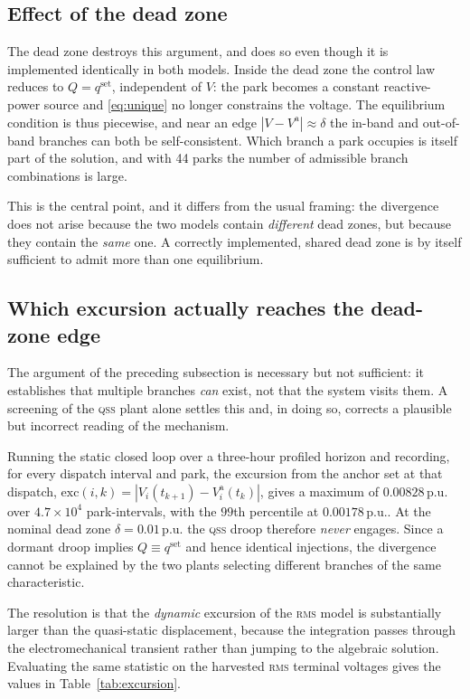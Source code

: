 \documentclass[11pt,a4paper]{article}
\newcommand{\pu}{\ensuremath{\mathrm{p.u.}}}
\newcommand{\qss}{\textsc{qss}}
\newcommand{\rms}{\textsc{rms}}
\begin{document}
\subsection{Effect of the dead zone}

The dead zone destroys this argument, and does so even though it is
implemented identically in both models. Inside the dead zone the control law
reduces to $Q = q^{\mathrm{set}}$, independent of $V$: the park becomes a
constant reactive-power source and \eqref{eq:unique} no longer constrains
the voltage. The equilibrium condition is thus piecewise, and near an edge
$|V - V^{\mathrm{a}}| \approx \delta$ the in-band and out-of-band branches
can both be self-consistent. Which branch a park occupies is itself part of
the solution, and with 44 parks the number of admissible branch combinations
is large.

This is the central point, and it differs from the usual framing: the
divergence does not arise because the two models contain \emph{different}
dead zones, but because they contain the \emph{same} one. A correctly
implemented, shared dead zone is by itself sufficient to admit more than one
equilibrium.

\subsection{Which excursion actually reaches the dead-zone edge}
\label{sec:excursion}

The argument of the preceding subsection is necessary but not sufficient: it
establishes that multiple branches \emph{can} exist, not that the system
visits them. A screening of the \qss{} plant alone settles this and, in
doing so, corrects a plausible but incorrect reading of the mechanism.

Running the static closed loop over a three-hour profiled horizon and
recording, for every dispatch interval and park, the excursion from the
anchor set at that dispatch,
$\mathrm{exc}(i,k) = |V_i(t_{k+1}) - V^{\mathrm{a}}_i(t_k)|$, gives a
maximum of $0.00828\,\pu$ over $4.7\times10^4$ park-intervals, with the
$99$th percentile at $0.00178\,\pu$. At the nominal dead zone
$\delta = 0.01\,\pu$ the \qss{} droop therefore \emph{never} engages. Since a
dormant droop implies $Q \equiv q^{\mathrm{set}}$ and hence identical
injections, the divergence cannot be explained by the two plants selecting
different branches of the same characteristic.

The resolution is that the \emph{dynamic} excursion of the \rms{} model is
substantially larger than the quasi-static displacement, because the
integration passes through the electromechanical transient rather than
jumping to the algebraic solution. Evaluating the same statistic on the
harvested \rms{} terminal voltages gives the values in
Table~\ref{tab:excursion}.
\end{document}
